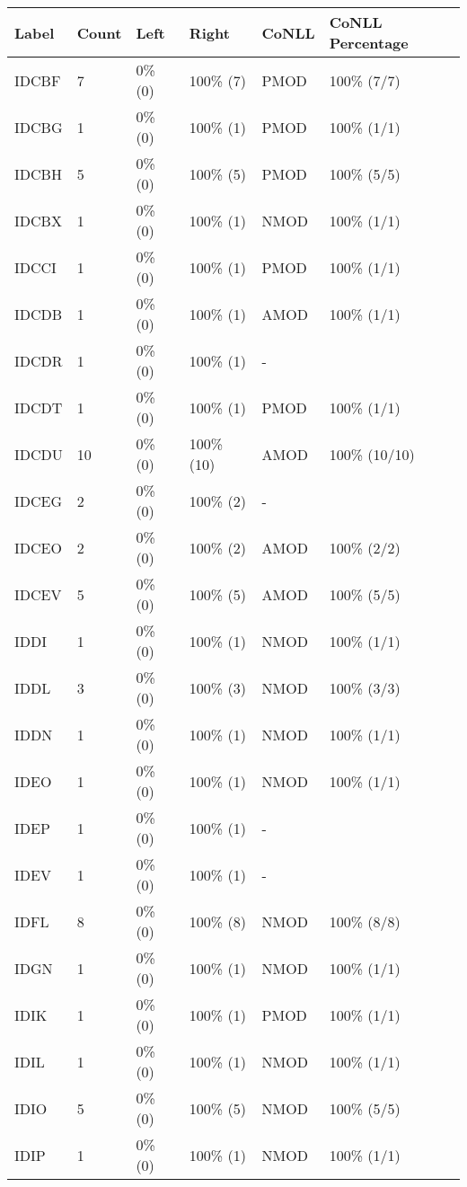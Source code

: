\begin{figure*}
\begin{tabular}{|l|l|l|l||l|l|}
\hline
Label & Count & Left & Right & CoNLL & CoNLL Percentage\\ 
\hline
 IDCBF & 7 & 0\% (0) & 100\% (7) & PMOD & 100\% (7/7) \\ 
\hline
 IDCBG & 1 & 0\% (0) & 100\% (1) & PMOD & 100\% (1/1) \\ 
\hline
 IDCBH & 5 & 0\% (0) & 100\% (5) & PMOD & 100\% (5/5) \\ 
\hline
 IDCBX & 1 & 0\% (0) & 100\% (1) & NMOD & 100\% (1/1) \\ 
\hline
 IDCCI & 1 & 0\% (0) & 100\% (1) & PMOD & 100\% (1/1) \\ 
\hline
 IDCDB & 1 & 0\% (0) & 100\% (1) & AMOD & 100\% (1/1) \\ 
\hline
 IDCDR & 1 & 0\% (0) & 100\% (1) & - &  \\ 
\hline
 IDCDT & 1 & 0\% (0) & 100\% (1) & PMOD & 100\% (1/1) \\ 
\hline
 IDCDU & 10 & 0\% (0) & 100\% (10) & AMOD & 100\% (10/10) \\ 
\hline
 IDCEG & 2 & 0\% (0) & 100\% (2) & - &  \\ 
\hline
 IDCEO & 2 & 0\% (0) & 100\% (2) & AMOD & 100\% (2/2) \\ 
\hline
 IDCEV & 5 & 0\% (0) & 100\% (5) & AMOD & 100\% (5/5) \\ 
\hline
 IDDI & 1 & 0\% (0) & 100\% (1) & NMOD & 100\% (1/1) \\ 
\hline
 IDDL & 3 & 0\% (0) & 100\% (3) & NMOD & 100\% (3/3) \\ 
\hline
 IDDN & 1 & 0\% (0) & 100\% (1) & NMOD & 100\% (1/1) \\ 
\hline
 IDEO & 1 & 0\% (0) & 100\% (1) & NMOD & 100\% (1/1) \\ 
\hline
 IDEP & 1 & 0\% (0) & 100\% (1) & - &  \\ 
\hline
 IDEV & 1 & 0\% (0) & 100\% (1) & - &  \\ 
\hline
 IDFL & 8 & 0\% (0) & 100\% (8) & NMOD & 100\% (8/8) \\ 
\hline
 IDGN & 1 & 0\% (0) & 100\% (1) & NMOD & 100\% (1/1) \\ 
\hline
 IDIK & 1 & 0\% (0) & 100\% (1) & PMOD & 100\% (1/1) \\ 
\hline
 IDIL & 1 & 0\% (0) & 100\% (1) & NMOD & 100\% (1/1) \\ 
\hline
 IDIO & 5 & 0\% (0) & 100\% (5) & NMOD & 100\% (5/5) \\ 
\hline
 IDIP & 1 & 0\% (0) & 100\% (1) & NMOD & 100\% (1/1) \\ 

\end{tabular}
\end{figure*}
